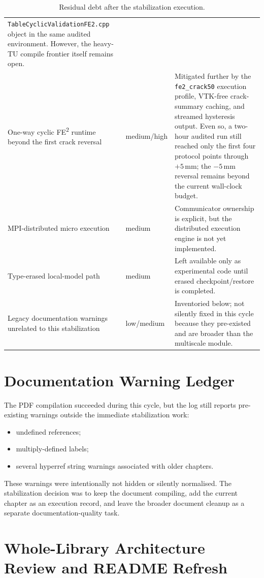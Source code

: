 \begin{table}[htb]
\begin{tabular}{p{}p{}p{}}
\texttt{TableCyclicValidationFE2.cpp} object in the same audited environment.
However, the heavy-TU compile frontier itself remains open. \\
One-way cyclic FE\textsuperscript{2} runtime beyond the first crack reversal &
medium/high &
Mitigated further by the \texttt{fe2\_crack50} execution profile, VTK-free
crack-summary caching, and streamed hysteresis output.  Even so, a two-hour
audited run still reached only the first four protocol points through
\(+5\)\,mm; the \(-5\)\,mm reversal remains beyond the current wall-clock
budget. \\
MPI-distributed micro execution &
medium &
Communicator ownership is explicit, but the distributed execution engine is not
yet implemented. \\
Type-erased local-model path &
medium &
Left available only as experimental code until erased checkpoint/restore is
completed. \\
Legacy documentation warnings unrelated to this stabilization &
low/medium &
Inventoried below; not silently fixed in this cycle because they pre-existed
and are broader than the multiscale module. \\
\bottomrule
\end{tabular}
\caption{Residual debt after the stabilization execution.}
\label{tab:ms-stab-residual-debt}
\end{table}

\section{Documentation Warning Ledger}
\label{sec:ms-stab-doc-ledger}

The PDF compilation succeeded during this cycle, but the log still reports
pre-existing warnings outside the immediate stabilization work:
\begin{itemize}
  \item undefined references;
  \item multiply-defined labels;
  \item several hyperref string warnings associated with older chapters.
\end{itemize}

These warnings were intentionally not hidden or silently normalised.  The
stabilization decision was to keep the document compiling, add the current
chapter as an execution record, and leave the broader document cleanup as a
separate documentation-quality task.

\section{Whole-Library Architecture Review and README Refresh}
\label{sec:ms-stab-library-review}

